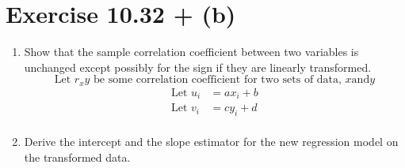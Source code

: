 \documentclass{article}
\begin{document}
\section*{Exercise 10.32  + (b)}

\begin{enumerate}[\quad(a)]
	\item Show that the sample correlation coefficient between two variables is unchanged except possibly for the sign if they are linearly transformed.
	\[ \text{Let } r_xy \text{ be some correlation coefficient for two sets of data, } x \text{and} y \]
	\begin{align*}
		\text{Let } u_i &= ax_i + b \\
		\text{Let } v_i &= cy_i + d \\
	\end{align*}
	\item Derive the intercept and the slope estimator for the new regression model on the transformed data.
\end{enumerate}
\end{document}
